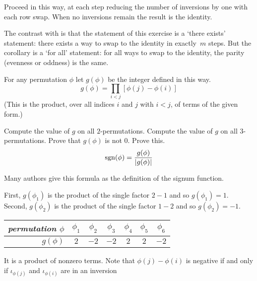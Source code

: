 \begin{exercises}
\begin{answer}
      Proceed in this way, at each step reducing the number of inversions
      by one
      with each row swap.
      When no inversions remain the result is the identity. 

      The contrast with 
      is that the statement of this exercise is a `there exists' statement:
      there exists a way to swap to the identity in exactly~$m$ steps.
      But the corollary is a `for all' statement: for all ways to swap to the
      identity, the parity (evenness or oddness) is the same. 
    \end{answer}
  \recommended \item 
    For any permutation $\phi$ let $g(\phi)$ be the integer 
    defined in this way.
    \begin{equation*}
       g(\phi)=\prod_{i<j} [\phi(j)-\phi(i)]
    \end{equation*}
    (This is the product, over all indices \( i \) and \( j \) with \( i<j \),
    of terms of the given form.)
    \begin{exparts}
      \partsitem Compute the value of $g$ on all $2$-permutations.
      \partsitem Compute the value of $g$ on all $3$-permutations.
      \partsitem Prove that $g(\phi)$ is not $0$.
      \partsitem Prove this.
         \begin{equation*}
            \operatorname{sgn}(\phi)=\frac{g(\phi)}{|g(\phi)|}
         \end{equation*}
    \end{exparts}
    Many authors give this formula as the definition of the signum function.
    \begin{answer}
      \begin{exparts}
        \partsitem First, $g(\phi_1)$ is the product of the single
          factor $2-1$ and so $g(\phi_1)=1$.
          Second, $g(\phi_2)$ is the product of the single
          factor $1-2$ and so $g(\phi_2)=-1$.
        \partsitem 
            \begin{tabular}[t]{r|cccccc}
               \textit{permutation $\phi$} 
                 &$\phi_{1}$ &$\phi_{2}$ &$\phi_{3}$ 
                    &$\phi_{4}$ &$\phi_{5}$ &$\phi_{6}$ \\
               \hline
               $g(\phi)$ &$2$ &$-2$ &$-2$ &$2$ &$2$ &$-2$ 
            \end{tabular}
        \partsitem It is a product of nonzero terms.
        \partsitem Note that \( \phi(j)-\phi(i) \) is negative if and only if
           \( \iota_{\phi(j)} \) and \( \iota_{\phi(i)} \) are in an inversion

\end{exparts}
\end{answer}
\end{exercises}
